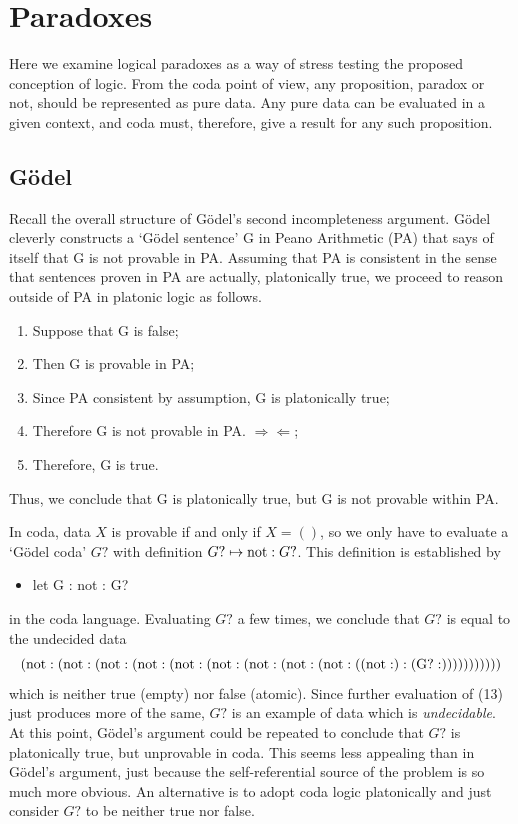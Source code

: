 \documentclass[11pt]{article}
\begin{document}
\section{Paradoxes}

     Here we examine logical paradoxes as a way of stress testing the proposed conception of logic.
From the coda point of view, any proposition, paradox or not, should be represented as pure data.
Any pure data can be evaluated in a given context, and coda must, therefore, give a result for 
any such proposition.

\subsection{G\"{o}del}

Recall the overall structure of G\"{o}del's second incompleteness argument\cite{Godel}.  G\"{o}del cleverly constructs a `G\"{o}del sentence' G
in Peano Arithmetic (PA) that says of itself that G is not provable in PA.  Assuming that PA is consistent in the sense
that sentences proven in PA are actually, platonically true, we proceed to reason outside of PA in platonic logic as follows.
\begin{enumerate}
\item Suppose that G is false;
\item Then G is provable in PA;
\item Since PA consistent by assumption, G is platonically true;
\item Therefore G is not provable in PA.  $\Rightarrow\!\Leftarrow$;
\item Therefore, G is true.
\end{enumerate}
Thus, we conclude that G is platonically true, but G is not provable within PA.

In coda, data $X$ is provable if and only if $X=()$, so we only have to evaluate a `G\"{o}del coda' $G?$
with definition $G?\mapsto {\rm not}:G?$.   This definition is established by
\begin{itemize}
\item let G : not : G?
\end{itemize}
in the coda language.
Evaluating $G?$ a few times, we conclude that $G?$ is equal to the undecided data
\begin{equation}\label{eqn}
{\rm (not:(not:(not:(not:(not:(not:(not:(not:(not:(({not}:):({G?}:)))))))))))}
\end{equation}
which is neither true (empty) nor false (atomic).
Since further evaluation of (13) just produces more of the same, $G?$ is an example of data which is {\it undecidable}.   At this point,
G\"{o}del's argument could be repeated to conclude that $G?$ is platonically true, but unprovable in coda.  This seems less
appealing than in G\"odel's argument, just because the self-referential source of the problem is so much more obvious.  An alternative
is to adopt coda logic platonically and just consider $G?$ to be neither true nor false.
\end{document}

